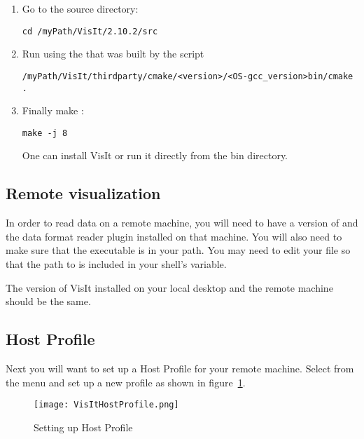 \documentclass[11pt,fleqn]{book} %
\begin{document}
\begin{enumerate}
  \item Go to the \Visit source directory:
\begin{lstlisting}[backgroundcolor=\color{background}]
cd /myPath/VisIt/2.10.2/src
\end{lstlisting}

  \item Run  using the  that was built by the  script
\begin{lstlisting}[backgroundcolor=\color{background}]
/myPath/VisIt/thirdparty/cmake/<version>/<OS-gcc_version>bin/cmake .
\end{lstlisting}

  \item Finally make \Visit:
\begin{lstlisting}[backgroundcolor=\color{background}]
make -j 8
\end{lstlisting}
        One can install VisIt or run it directly from the bin directory.
\end{enumerate}


\subsection{Remote visualization}
In order to read data on a remote machine, you will need to have a
version of \Visit and the \Uintah data format reader plugin installed on that
machine. You will also need to make sure that the \Visit executable is
in your path. You may need to edit your  
file so that the path to \Visit is included in your shell's  variable.

\begin{NoteBox}
The version of VisIt installed on your local desktop and the
remote machine should be the same.
\end{NoteBox}

\subsection{Host Profile}
Next you will want to set up a Host Profile for your remote
machine. Select  from the  menu and set up a
new profile as shown in figure~\ref{VisItHostProfile}.
\begin{figure}
  \centering
  \texttt{[image: VisItHostProfile.png]}
  \caption{Setting up Host Profile}
  \label{VisItHostProfile}
\end{figure}
\end{document}
